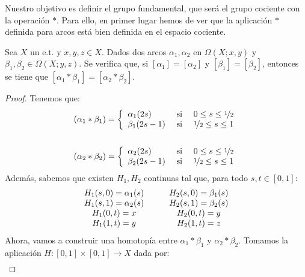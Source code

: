 Nuestro objetivo es definir el grupo fundamental, que será el grupo cociente con la operación $\ast$. Para ello, en primer lugar hemos de ver que la aplicación $\ast$ definida para arcos está bien definida en el espacio cociente.
\begin{lema}
    Sea $X$ un e.t. y $x,y,z\in X$.
    Dados dos arcos $\alpha_1, \alpha_2$ en $\Omega(X;x,y)$ y $\beta_1, \beta_2\in \Omega(X; y,z)$. Se verifica que, si $[\alpha_1] = [\alpha_2]$ y $[\beta_1] = [\beta_2]$, entonces se tiene que $[\alpha_1\ast\beta_1] = [\alpha_2\ast\beta_2]$.

    \begin{proof}
        Tenemos que:
        \begin{gather*}
            (\alpha_1\ast\beta_1) = \left\{
                \begin{array}{l c c}
                    \alpha_1(2s) & \text{ si } & 0 \leq s \leq \nicefrac{1}{2}\\
                    \beta_1(2s-1) & \text{ si } & \nicefrac{1}{2} \leq s \leq 1
                \end{array}
            \right.\\\\
            (\alpha_2\ast\beta_2) = \left\{
                \begin{array}{l c c}
                    \alpha_2(2s) & \text{ si } & 0 \leq s \leq \nicefrac{1}{2}\\
                    \beta_2(2s-1) & \text{ si } & \nicefrac{1}{2} \leq s \leq 1
                \end{array}
            \right.
        \end{gather*}
        Además, sabemos que existen $H_1, H_2$ continuas tal que, para todo $s,t\in [0,1]$:
        \begin{gather*}
            \begin{array}{c c c c}
                H_1(s,0) = \alpha_1(s) &&& H_2(s,0) = \beta_1(s)\\
                H_1(s,1) = \alpha_2(s) &&& H_2(s,1) = \beta_2(s)\\
                H_1(0,t) = x &&& H_2(0,t) = y\\
                H_1(1, t) = y &&& H_2(1,t) = z
            \end{array}
        \end{gather*}
        Ahora, vamos a construir una homotopía entre $\alpha_1\ast\beta_1$ y $\alpha_2\ast\beta_2$.
        Tomamos la aplicación $H:[0,1]\times [0,1] \to X$ dada por: 
        \begin{gather*}

\end{gather*}
\end{proof}
\end{lema}
